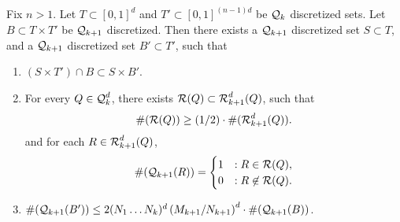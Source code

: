 \begin{lemma} \label{Lemma315091513}
    Fix $n > 1$. Let $T \subset [0,1]^d$ and $T' \subset [0,1]^{(n-1)d}$ be $\operatorname{\mathcal{Q}}_k$ discretized sets. Let $B \subset T \times T'$ be $\operatorname{\mathcal{Q}}_{k+1}$ discretized. Then there exists a $\operatorname{\mathcal{Q}}_{k+1}$ discretized set $S \subset T$, and a $\operatorname{\mathcal{Q}}_{k+1}$ discretized set $B' \subset T'$, such that
    \begin{enumerate}
        \item \label{dimensionReductionProperty} $(S \times T') \cap B \subset S \times B'$.

        \item \label{bigProperty} For every $Q \in \operatorname{\mathcal{Q}}_k^d$, there exists $\mathcal{R}(Q) \subset \operatorname{\mathcal{R}}_{k+1}^d(Q)$, such that
        \[ \#(\mathcal{R}(Q)) \geq (1/2) \cdot \#(\operatorname{\mathcal{R}}_{k+1}^d(Q)). \]
        and for each $R \in \operatorname{\mathcal{R}}_{k+1}^d(Q)$,
        \[ \#(\operatorname{\mathcal{Q}}_{k+1}(R)) = \begin{cases} 1 &: R \in \mathcal{R}(Q), \\ 0 &: R \not \in \mathcal{R}(Q). \end{cases} \]

        \item \label{BBoundProperty} $\#(\operatorname{\mathcal{Q}}_{k+1}(B')) \leq 2 (N_1 \dots N_k)^d \left( M_{k+1}/N_{k+1} \right)^d \cdot \#(\operatorname{\mathcal{Q}}_{k+1}(B))$.
    \end{enumerate}
\end{lemma}
